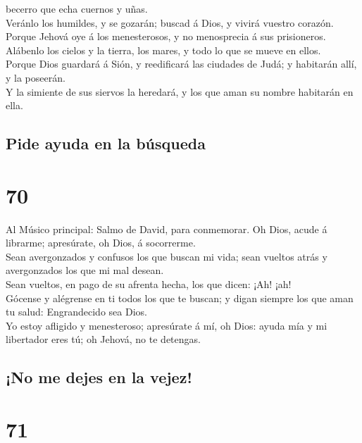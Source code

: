 becerro que echa cuernos y uñas.\\
 Veránlo los humildes, y se gozarán; buscad á Dios, y
vivirá vuestro corazón.\\
 Porque Jehová oye á los menesterosos, y no menosprecia á
sus prisioneros.\\
 Alábenlo los cielos y la tierra, los mares, y todo lo
que se mueve en ellos.\\
 Porque Dios guardará á Sión, y reedificará las ciudades
de Judá; y habitarán allí, y la poseerán.\\
 Y la simiente de sus siervos la heredará, y los que aman
su nombre habitarán en ella.

\hypertarget{pide-ayuda-en-la-buxfasqueda}{%
\subsection{Pide ayuda en la
búsqueda}\label{pide-ayuda-en-la-buxfasqueda}}

\hypertarget{section-19-70}{%
\section{70}\label{section-19-70}}

 Al Músico principal: Salmo de David, para conmemorar. Oh
Dios, acude á librarme; apresúrate, oh Dios, á socorrerme.\\
 Sean avergonzados y confusos los que buscan mi vida; sean
vueltos atrás y avergonzados los que mi mal desean.\\
 Sean vueltos, en pago de su afrenta hecha, los que dicen:
¡Ah! ¡ah!\\
 Gócense y alégrense en ti todos los que te buscan; y
digan siempre los que aman tu salud: Engrandecido sea Dios.\\
 Yo estoy afligido y menesteroso; apresúrate á mí, oh
Dios: ayuda mía y mi libertador eres tú; oh Jehová, no te detengas.

\hypertarget{no-me-dejes-en-la-vejez}{%
\subsection{¡No me dejes en la vejez!}\label{no-me-dejes-en-la-vejez}}

\hypertarget{section-19-71}{%
\section{71}\label{section-19-71}}

